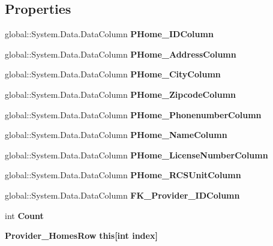 \subsection*{Properties}
\begin{DoxyCompactItemize}
\item 
global\+::\+System.\+Data.\+Data\+Column \textbf{ P\+Home\+\_\+\+I\+D\+Column}\hspace{0.3cm}{\ttfamily  [get]}
\item 
global\+::\+System.\+Data.\+Data\+Column \textbf{ P\+Home\+\_\+\+Address\+Column}\hspace{0.3cm}{\ttfamily  [get]}
\item 
global\+::\+System.\+Data.\+Data\+Column \textbf{ P\+Home\+\_\+\+City\+Column}\hspace{0.3cm}{\ttfamily  [get]}
\item 
global\+::\+System.\+Data.\+Data\+Column \textbf{ P\+Home\+\_\+\+Zipcode\+Column}\hspace{0.3cm}{\ttfamily  [get]}
\item 
global\+::\+System.\+Data.\+Data\+Column \textbf{ P\+Home\+\_\+\+Phonenumber\+Column}\hspace{0.3cm}{\ttfamily  [get]}
\item 
global\+::\+System.\+Data.\+Data\+Column \textbf{ P\+Home\+\_\+\+Name\+Column}\hspace{0.3cm}{\ttfamily  [get]}
\item 
global\+::\+System.\+Data.\+Data\+Column \textbf{ P\+Home\+\_\+\+License\+Number\+Column}\hspace{0.3cm}{\ttfamily  [get]}
\item 
global\+::\+System.\+Data.\+Data\+Column \textbf{ P\+Home\+\_\+\+R\+C\+S\+Unit\+Column}\hspace{0.3cm}{\ttfamily  [get]}
\item 
global\+::\+System.\+Data.\+Data\+Column \textbf{ F\+K\+\_\+\+Provider\+\_\+\+I\+D\+Column}\hspace{0.3cm}{\ttfamily  [get]}
\item 
int \textbf{ Count}\hspace{0.3cm}{\ttfamily  [get]}
\item 
\textbf{ Provider\+\_\+\+Homes\+Row} \textbf{ this[int index]}\hspace{0.3cm}{\ttfamily  [get]}
\end{DoxyCompactItemize}
